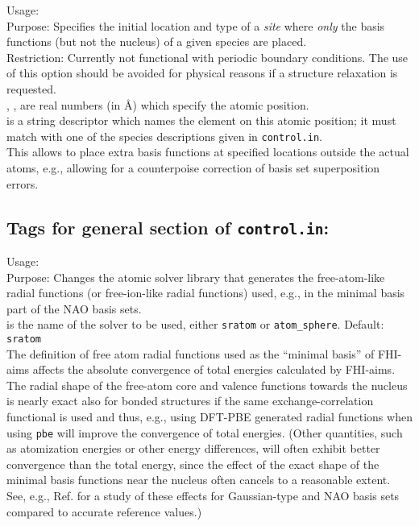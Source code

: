 {
  \noindent
  Usage:    
   \\[1.0ex]
  Purpose: Specifies the initial location and type of a \emph{site}
  where \emph{only} the basis functions (but not the nucleus) of a
  given species are placed.
  \\[1.0ex]
  Restriction: Currently not functional with periodic boundary
    conditions. The use of this option should be avoided for physical
    reasons if a structure relaxation is requested.\\[1.0ex]
  , ,  are real numbers (in \AA) which
  specify the atomic position. \\[1.0ex]
   is a string descriptor which names the element on
    this atomic position; it must match with one of the species descriptions
    given in \texttt{control.in}. \\
}
This allows to place extra basis functions at specified locations
outside the actual atoms, e.g., allowing for a counterpoise
correction of basis set superposition errors.

\newpage

\subsection*{Tags for general section of \texttt{control.in}:}

{\noindent
  Usage:   \\[1.0ex]
  Purpose: Changes the atomic solver library that generates the
  free-atom-like radial functions (or free-ion-like radial functions)
  used, e.g., in the minimal basis part of the NAO basis sets. 
  \\[1.0ex]
   is the name of the solver to be used, either \texttt{sratom} or
  \texttt{atom\_sphere}. Default: \texttt{sratom}  \\
}
The definition of free atom radial functions used as the ``minimal
basis'' of FHI-aims affects the absolute convergence of total energies
calculated by FHI-aims. The radial shape of the
free-atom core and valence functions towards the nucleus is nearly
exact also for bonded structures if the same exchange-correlation
functional is used and thus, e.g., using DFT-PBE generated radial functions
when using  \texttt{pbe} will improve the convergence of
total energies. (Other quantities, such as atomization energies or other
energy differences, will often exhibit better convergence than the
total energy, since the effect of the exact shape of the minimal basis
functions near the nucleus often cancels to a reasonable extent. See,
e.g., Ref. \cite{Jensen2017} for a study of these effects for
Gaussian-type and NAO basis sets compared to accurate reference values.)

